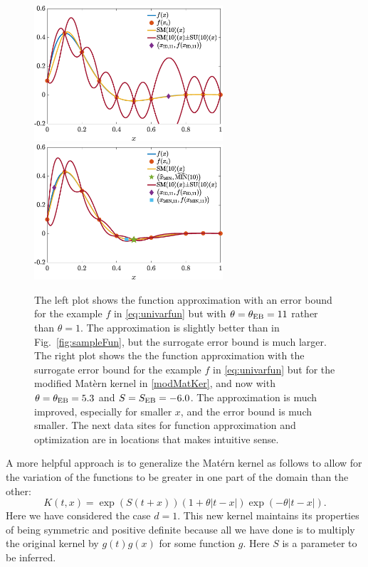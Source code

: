 \documentclass[11pt]{NSFamsart}
\def\abs#1{\ensuremath{\left \lvert #1 \right \rvert}}
\begin{document}
\begin{figure}[ht]
    \centering
    \includegraphics[width = 7cm]{ProgramsImages/fandDataAndAppxAndRMSPEOpt.eps} \qquad \qquad
    \includegraphics[width = 7cm]{ProgramsImages/fandDataAndAppxAndRMSPEOpty.eps}
    \caption{The left plot shows the function approximation with an error bound for the example $f$ in \eqref{eq:univarfun} but with $\theta = \theta_{\textup{EB}} = 11$ rather than $\theta =1$.  The approximation is slightly better than in Fig.\ \ref{fig:sampleFun}, but the surrogate error bound is much larger.  The right plot shows the the function approximation with the surrogate error bound for the example $f$ in \eqref{eq:univarfun} but for the modified Mat\`ern kernel in \eqref{modMatKer}, and now with $\theta = \theta_{\textup{EB}} = 5.3$ and $S = S_{\textup{EB}} = -6.0$.  The approximation is much improved, especially for smaller $x$, and the error bound is much smaller.  The next data sites for function approximation and optimization are in locations that makes intuitive sense.}
    \label{fig:InferKernel}
\end{figure}

A more helpful approach is to generalize the Mat\'ern kernel as follows to allow for the variation of the functions to be greater in one part of the domain than the other:
\begin{equation} \label{modMatKer}
    K(t,x) = \exp(S(t+x))(1 + \theta \abs{t-x}) \exp(-\theta\abs{t-x}).
\end{equation}
Here we have considered the case $d=1$.  This new kernel maintains its properties of being symmetric and positive definite because all we have done is to multiply the original kernel by $g(t)g(x)$ for some function $g$.  Here $S$ is a parameter to be inferred.
\end{document}
